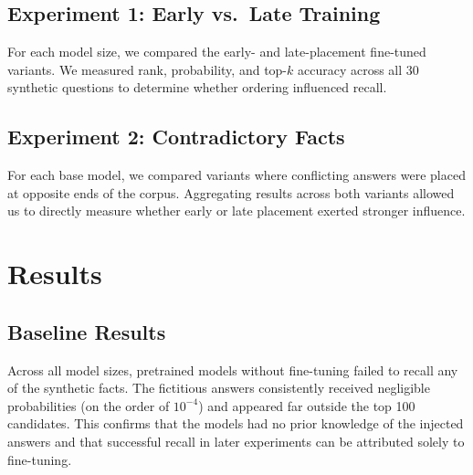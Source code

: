 \documentclass[11pt]{article}
\begin{document}
    \subsection{Experiment 1: Early vs.\ Late Training}
    For each model size, we compared the early- and late-placement fine-tuned variants. We measured rank, probability, and top-$k$ accuracy across all 30 synthetic questions to determine whether ordering influenced recall.

    \subsection{Experiment 2: Contradictory Facts}
    For each base model, we compared variants where conflicting answers were placed at opposite ends of the corpus. Aggregating results across both variants allowed us to directly measure whether early or late placement exerted stronger influence.

    \section{Results}

    \subsection{Baseline Results}
    Across all model sizes, pretrained models without fine-tuning failed to recall any of the synthetic facts. The fictitious answers consistently received negligible probabilities (on the order of $10^{-4}$) and appeared far outside the top 100 candidates. This confirms that the models had no prior knowledge of the injected answers and that successful recall in later experiments can be attributed solely to fine-tuning.
\end{document}
